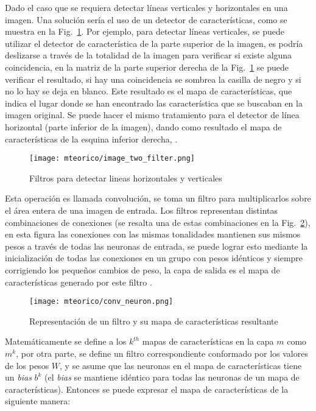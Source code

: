     Dado el caso que se requiera detectar líneas verticales y horizontales en una imagen. Una solución sería el uso de un detector de características, como se muestra en la Fig.~\ref{fig:image_two_filter}. Por ejemplo, para detectar líneas verticales, se puede utilizar el detector de característica de la parte superior de la imagen, es podría deslizarse a través de la totalidad de la imagen para verificar si existe alguna coincidencia, en la matriz de la parte superior derecha de la Fig.~\ref{fig:image_two_filter} se puede verificar el resultado, si hay una coincidencia se sombrea la casilla de negro y si no lo hay se deja en blanco. Este resultado es el mapa de características, que indica el lugar donde se han encontrado las característica que se buscaban en la imagen original. Se puede hacer el mismo tratamiento para el detector de línea horizontal (parte inferior de la imagen), dando como resultado el mapa de características de la esquina inferior derecha, \cite{NIPS2010_0550, dlBook}.
    \begin{figure}[htp]
        \centering
        \texttt{[image: mteorico/image\_two\_filter.png]}
        \caption{Filtros para detectar lineas horizontales y verticales}
        \label{fig:image_two_filter}
    \end{figure}

    Esta operación es llamada convolución, se toma un filtro para multiplicarlos sobre el área entera de una imagen de entrada. Los filtros representan distintas combinaciones de conexiones (se resalta una de estas combinaciones en la Fig.~\ref{fig:conv_neuron}), en esta figura las conexiones con las mismas tonalidades mantienen sus mismos pesos a través de todas las neuronas de entrada, se puede lograr esto mediante la inicialización de todas las conexiones en un grupo con pesos idénticos y siempre corrigiendo los pequeños cambios de peso, la capa de salida es el mapa de características generado por este filtro \cite{dlBook}.
    \begin{figure}[htp]
        \centering
        \texttt{[image: mteorico/conv\_neuron.png]}
        \caption{Representación de un filtro y su mapa de características resultante}
        \label{fig:conv_neuron}
    \end{figure}

    Matemáticamente se define a los $k^{th}$ mapas de características en la capa $m$ como $m^k$, por otra parte, se define un filtro correspondiente conformado por los valores de los pesos $W$, y se asume que las neuronas en el mapa de características tiene un \textit{bias} $b^k$ (el \textit{bias} se mantiene idéntico para todas las neuronas de un mapa de características). Entonces se puede expresar el mapa de características de la siguiente manera:

